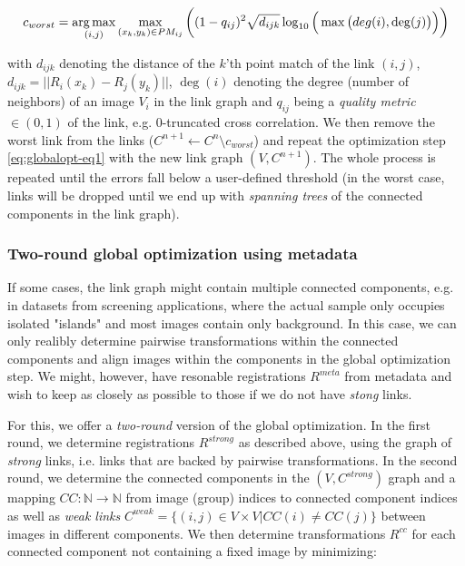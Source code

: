 \begin{equation}
\label{eq:globalopt-eq3}
c_{worst} = \operatorname*{arg\,max}_{(i,j)} \max_{(x_k, y_k) \in PM_{ij}}\bigg( (1-q_{ij})^2 \sqrt{d_{ijk}} \log_{10}\Big(\max\big(deg(i), \deg(j)\big)\Big)\bigg) 
\end{equation}

with $d_{ijk}$ denoting the distance of the $k$'th point match of the link $(i,j)$, $d_{ijk} = || R_{i}(x_k) - R_{j}(y_k) ||$, $\deg(i)$ denoting the degree (number of neighbors) of an image $V_i$ in the link graph and $q_{ij}$ being a \emph{quality metric} $\in (0,1)$ of the link, e.g. 0-truncated cross correlation. We then remove the worst link from the links ($C^{n+1} \leftarrow C^{n} \setminus c_{worst}$) and repeat the optimization step \ref{eq:globalopt-eq1} with the new link graph $(V, C^{n+1})$. The whole process is repeated until the errors fall below a user-defined threshold (in the worst case, links will be dropped until we end up with \emph{spanning trees} of the connected components in the link graph). 

\subsubsection{Two-round global optimization using metadata}

If some cases, the link graph might contain multiple connected components, e.g. in datasets from screening applications, where the actual sample only occupies isolated "islands" and most images contain only background. In this case, we can only realibly determine pairwise transformations within the connected components and align images within the components in the global optimization step. We might, however, have resonable registrations $R^{meta}$ from metadata and wish to keep as closely as possible to those if we do not have \emph{stong} links.

For this, we offer a \emph{two-round} version of the global optimization. In the first round, we determine registrations $R^{strong}$ as described above, using the graph of \emph{strong} links, i.e. links that are backed by pairwise transformations. In the second round, we determine the connected components in the $(V, C^{strong} )$ graph and a mapping $CC: \mathbb{N} \to \mathbb{N}$ from image (group) indices to  connected component indices as well as \emph{weak links} $C^{weak} = \{(i,j) \in V \times V | CC(i) \neq CC(j) \}$ between images in different components. We then determine transformations $R^{cc}$ for each connected component not containing a fixed image by minimizing:

